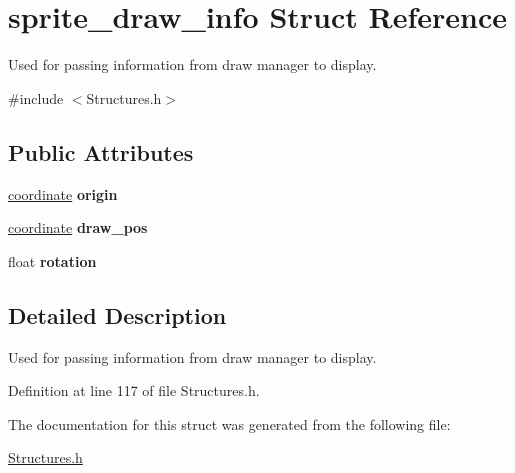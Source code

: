 \hypertarget{structsprite__draw__info}{\section{sprite\+\_\+draw\+\_\+info Struct Reference}
\label{structsprite__draw__info}
}


Used for passing information from draw manager to display.  




{\ttfamily \#include $<$Structures.\+h$>$}

\subsection*{Public Attributes}
\begin{DoxyCompactItemize}
\item 
\hypertarget{structsprite__draw__info_a7c12e335ba1fc83156a05a568d38a179}{\hyperlink{structcoordinate}{coordinate} {\bfseries origin}}\label{structsprite__draw__info_a7c12e335ba1fc83156a05a568d38a179}

\item 
\hypertarget{structsprite__draw__info_acf0a863cddf497e364e3cdc9c46b8564}{\hyperlink{structcoordinate}{coordinate} {\bfseries draw\+\_\+pos}}\label{structsprite__draw__info_acf0a863cddf497e364e3cdc9c46b8564}

\item 
\hypertarget{structsprite__draw__info_a41292dd9fa6ca00d553a6c93f18e2a40}{float {\bfseries rotation}}\label{structsprite__draw__info_a41292dd9fa6ca00d553a6c93f18e2a40}

\end{DoxyCompactItemize}


\subsection{Detailed Description}
Used for passing information from draw manager to display. 

Definition at line 117 of file Structures.\+h.



The documentation for this struct was generated from the following file\+:\begin{DoxyCompactItemize}
\item 
\hyperlink{_structures_8h}{Structures.\+h}\end{DoxyCompactItemize}
